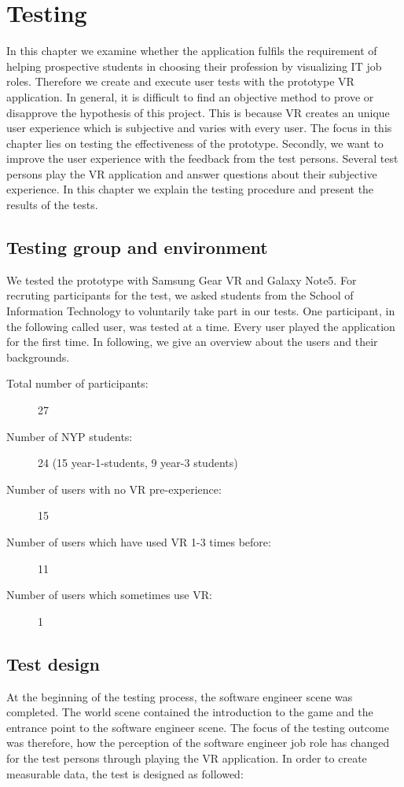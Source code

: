 \chapter{Testing}\label{testing}
In this chapter we examine whether the application fulfils the requirement of helping prospective students in choosing their profession by visualizing IT job roles. Therefore we create and execute user tests with the prototype VR application. In general, it is difficult to find an objective method to prove or disapprove the hypothesis of this project. This is because VR creates an unique user experience which is subjective and varies with every user. The focus in this chapter lies on testing the effectiveness of the prototype. Secondly, we want to improve the user experience with the feedback from the test persons. Several test persons play the VR application and answer questions about their subjective experience. In this chapter we explain the testing procedure and present the results of the tests.

\section{Testing group and environment}
We tested the prototype with Samsung Gear VR and Galaxy Note5. For recruting participants for the test, we asked students from the School of Information Technology to voluntarily take part in our tests. One participant, in the following called user, was tested at a time. Every user played the application for the first time. In following, we give an overview about the users and their backgrounds. 
\begin{description}
	\item[Total number of participants:] 27
	\item[Number of NYP students:] 24 (15 year-1-students, 9 year-3 students)
	\item[Number of users with no VR pre-experience:] 15
	\item[Number of users which have used VR 1-3 times before:] 11
	\item[Number of users which sometimes use VR:] 1
\end{description}
\section{Test design}
At the beginning of the testing process, the software engineer scene was completed. The world scene contained the introduction to the game and the entrance point to the software engineer scene. The focus of the testing outcome was therefore, how the perception of the software engineer job role has changed for the test persons through playing the VR application. In order to create measurable data, the test is designed as followed:

